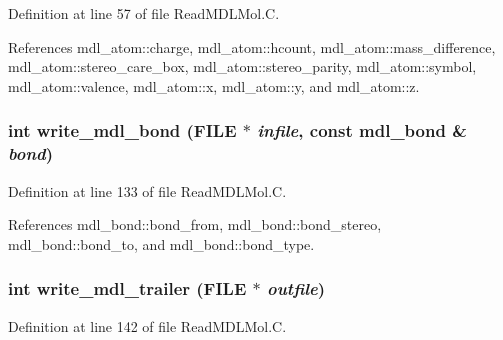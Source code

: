 Definition at line 57 of file Read\-MDLMol.C.

References mdl\_\-atom::charge, mdl\_\-atom::hcount, mdl\_\-atom::mass\_\-difference, mdl\_\-atom::stereo\_\-care\_\-box, mdl\_\-atom::stereo\_\-parity, mdl\_\-atom::symbol, mdl\_\-atom::valence, mdl\_\-atom::x, mdl\_\-atom::y, and mdl\_\-atom::z.
\subsubsection{\setlength{\rightskip}{0pt plus 5cm}int write\_\-mdl\_\-bond (FILE $\ast$ {\em infile}, const {\bf mdl\_\-bond} \& {\em bond})}\label{ReadMDLMol_8C_a4}




Definition at line 133 of file Read\-MDLMol.C.

References mdl\_\-bond::bond\_\-from, mdl\_\-bond::bond\_\-stereo, mdl\_\-bond::bond\_\-to, and mdl\_\-bond::bond\_\-type.
\subsubsection{\setlength{\rightskip}{0pt plus 5cm}int write\_\-mdl\_\-trailer (FILE $\ast$ {\em outfile})}\label{ReadMDLMol_8C_a5}




Definition at line 142 of file Read\-MDLMol.C.